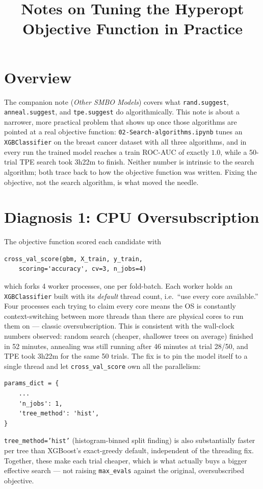 \documentclass[conference]{IEEEtran}
\title{Notes on Tuning the Hyperopt Objective Function in Practice}
\author{
\IEEEauthorblockN{Luis Mendez}
}
\begin{document}
\maketitle

\section*{Overview}
The companion note (\textit{Other SMBO Models}) covers what \texttt{rand.suggest}, \texttt{anneal.suggest}, and \texttt{tpe.suggest} do algorithmically. This note is about a narrower, more practical problem that shows up once those algorithms are pointed at a real objective function: \texttt{02-Search-algorithms.ipynb} tunes an \texttt{XGBClassifier} on the breast cancer dataset with all three algorithms, and in every run the trained model reaches a train ROC-AUC of exactly $1.0$, while a 50-trial TPE search took 3h22m to finish. Neither number is intrinsic to the search algorithm; both trace back to how the objective function was written. Fixing the objective, not the search algorithm, is what moved the needle.

\section*{Diagnosis 1: CPU Oversubscription}
The objective function scored each candidate with
\begin{verbatim}
cross_val_score(gbm, X_train, y_train,
    scoring='accuracy', cv=3, n_jobs=4)
\end{verbatim}
which forks 4 worker processes, one per fold-batch. Each worker holds an \texttt{XGBClassifier} built with its \emph{default} thread count, i.e.\ ``use every core available.'' Four processes each trying to claim every core means the OS is constantly context-switching between more threads than there are physical cores to run them on --- classic oversubscription. This is consistent with the wall-clock numbers observed: random search (cheaper, shallower trees on average) finished in 52 minutes, annealing was still running after 46 minutes at trial 28/50, and TPE took 3h22m for the same 50 trials. The fix is to pin the model itself to a single thread and let \texttt{cross\_val\_score} own all the parallelism:
\begin{verbatim}
params_dict = {
    ...
    'n_jobs': 1,
    'tree_method': 'hist',
}
\end{verbatim}
\texttt{tree\_method='hist'} (histogram-binned split finding) is also substantially faster per tree than XGBoost's exact-greedy default, independent of the threading fix. Together, these make each trial cheaper, which is what actually buys a bigger effective search --- not raising \texttt{max\_evals} against the original, oversubscribed objective.
\end{document}
